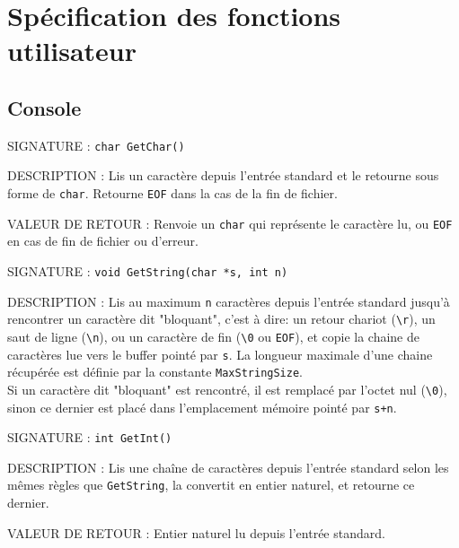 \documentclass{article}
\begin{document}
\section{Spécification des fonctions utilisateur}
	\subsection{Console}
		\begin{description}
			\item{SIGNATURE : } \texttt{char GetChar()}
			\item{DESCRIPTION :}{ Lis un caractère depuis l'entrée standard et le retourne sous forme de \texttt{char}. Retourne \texttt{EOF} dans la cas de la fin de fichier.}
			\item{VALEUR DE RETOUR : } Renvoie un \texttt{char} qui représente le caractère lu, ou \texttt{EOF} en cas de fin de fichier ou d'erreur.
		\end{description}
		\vspace{2.5mm}
		\begin{description}
			\item{SIGNATURE : } \texttt{void GetString(char *s, int n)}
			\item{DESCRIPTION : } Lis au maximum \texttt{n} caractères depuis l'entrée standard jusqu'à rencontrer un caractère dit "bloquant", c'est à dire: un retour chariot (\texttt{\textbackslash{}r}), un saut de ligne (\texttt{\textbackslash{}n}), ou un caractère de fin (\texttt{\textbackslash{}0} ou \texttt{EOF}), et copie la chaine de caractères lue vers le buffer pointé par \texttt{s}. La longueur maximale d'une chaine récupérée est définie par la constante \texttt{MaxStringSize}. \\Si un caractère dit "bloquant" est rencontré, il est remplacé par l'octet nul (\texttt{\textbackslash{}0}), sinon ce dernier est placé dans l'emplacement mémoire pointé par \texttt{s+n}.
		\end{description}
		\vspace{2.5mm}
		\begin{description}
			\item{SIGNATURE : } \texttt{int GetInt()}
			\item{DESCRIPTION : } Lis une chaîne de caractères depuis l'entrée standard selon les mêmes règles que \texttt{GetString}, la convertit en entier naturel, et retourne ce dernier.
			\item{VALEUR DE RETOUR : } Entier naturel lu depuis l'entrée standard.
		\end{description}
\end{document}
